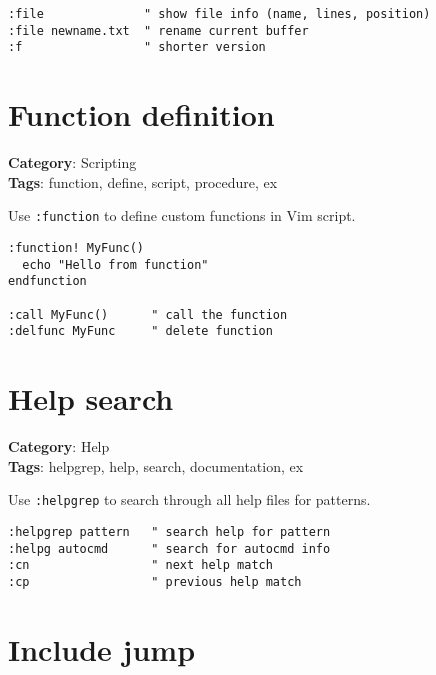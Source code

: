 {{{{{{\begin{Exa*}{}
\begin{Verbatim}[fontsize=\footnotesize, breaklines, breakanywhere]
:file              " show file info (name, lines, position)
:file newname.txt  " rename current buffer
:f                 " shorter version
\end{Verbatim}
\end{Exa*}

\section{Function definition}

\textbf{Category}: Scripting\\ \textbf{Tags}: function, define, script, procedure, ex
\vspace{0.5cm}

Use {\footnotesize \Verb§:function§} to define custom functions in Vim script.

\begin{Exa*}{}
\begin{Verbatim}[fontsize=\footnotesize, breaklines, breakanywhere]
:function! MyFunc()
  echo "Hello from function"
endfunction

:call MyFunc()      " call the function
:delfunc MyFunc     " delete function
\end{Verbatim}
\end{Exa*}

\section{Help search}

\textbf{Category}: Help\\ \textbf{Tags}: helpgrep, help, search, documentation, ex
\vspace{0.5cm}

Use {\footnotesize \Verb§:helpgrep§} to search through all help files for patterns.

\begin{Exa*}{}
\begin{Verbatim}[fontsize=\footnotesize, breaklines, breakanywhere]
:helpgrep pattern   " search help for pattern
:helpg autocmd      " search for autocmd info
:cn                 " next help match
:cp                 " previous help match
\end{Verbatim}
\end{Exa*}

\section{Include jump}

}}}}}}
